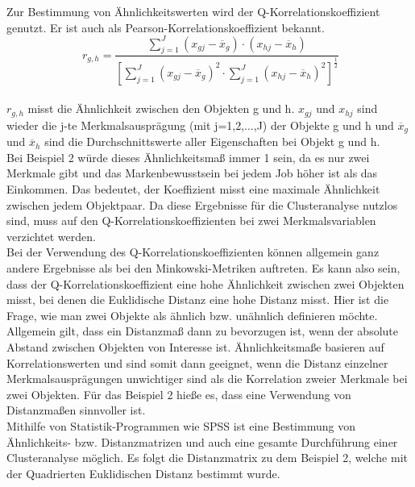 \documentclass[12pt,titlepage]{article}
\begin{document}
Zur Bestimmung von Ähnlichkeitswerten wird der Q-Korrelationskoeffizient genutzt. Er ist auch als Pearson-Korrelationskoeffizient bekannt.
 \begin{equation}
  \ r_{g,h}=\frac{\sum_{j=1}^{J} (x_{gj}-\overline{x}_{g})\cdot (x_{hj}-\overline{x}_{h})}{[\sum_{j=1}^{J} (x_{gj}-\overline{x}_{g})^{2}\cdot \sum_{j=1}^{J} (x_{hj}-\overline{x}_{h})^2]^{\frac{1}{2}}}
 \end{equation}\\
$r_{g,h}$ misst die Ähnlichkeit zwischen den Objekten g und h. $x_{gj}$ und $x_{hj}$ sind wieder die j-te Merkmalsausprägung (mit j=1,2,...,J) der Objekte g und h und $\overline{x}_{g}$ und $\overline{x}_{h}$ sind die Durchschnittswerte aller Eigenschaften bei Objekt g und h. \\
Bei Beispiel 2 würde dieses Ähnlichkeitsmaß immer 1 sein, da es nur zwei Merkmale gibt und das Markenbewusstsein bei jedem Job höher ist als das Einkommen. Das bedeutet, der Koeffizient misst eine maximale Ähnlichkeit zwischen jedem Objektpaar. Da diese Ergebnisse für die Clusteranalyse nutzlos sind, muss auf den Q-Korrelationskoeffizienten bei zwei Merkmalsvariablen verzichtet werden. \\
Bei der Verwendung des Q-Korrelationskoeffizienten können allgemein ganz andere Ergebnisse als bei den Minkowski-Metriken auftreten. Es kann also sein, dass der Q-Korrelationskoeffizient eine hohe Ähnlichkeit zwischen zwei Objekten misst, bei denen die Euklidische Distanz eine hohe Distanz misst. Hier ist die Frage, wie man zwei Objekte als ähnlich bzw. unähnlich definieren möchte. \\ 
Allgemein gilt, dass ein Distanzmaß dann zu bevorzugen ist, wenn der absolute Abstand zwischen Objekten von Interesse ist. Ähnlichkeitsmaße basieren auf Korrelationswerten und sind somit dann geeignet, wenn die Distanz einzelner Merkmalsausprägungen unwichtiger sind als die Korrelation zweier Merkmale bei zwei Objekten. Für das Beispiel 2 hieße es, dass eine Verwendung von Distanzmaßen sinnvoller ist. \\
Mithilfe von Statistik-Programmen wie SPSS ist eine Bestimmung von Ähnlichkeits- bzw. Distanzmatrizen und auch eine gesamte Durchführung einer Clusteranalyse möglich. Es folgt die Distanzmatrix zu dem Beispiel 2, welche mit der Quadrierten Euklidischen Distanz bestimmt wurde. \\ 
\end{document}
